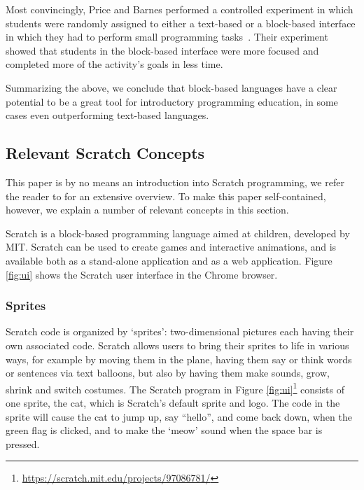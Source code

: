 \documentclass{sig-alternate}
\begin{document}
Most convincingly, Price and Barnes performed a controlled experiment in which students were randomly assigned to either a text-based or a block-based interface in  which they had to perform small programming tasks~\cite{price_comparing_2015}. Their experiment showed that students in the block-based interface were more focused and completed more of the activity's goals in less time.

Summarizing the above, we conclude that block-based languages have a clear potential to be a great tool for introductory programming education, in some cases even outperforming text-based languages.

\subsection{Relevant Scratch Concepts}
\label{sec:scratch}
This paper is by no means an introduction into Scratch programming, we refer the reader to \cite{brennan_creative_2014} for an extensive overview. To make this paper self-contained, however, we explain a number of relevant concepts in this section. 

Scratch is a block-based programming language aimed at children, developed by MIT. Scratch can be used to create games and interactive animations, and is available both as a stand-alone application and as a web application. Figure \ref{fig:ui} shows the Scratch user interface in the Chrome browser.

\subsubsection{Sprites}
Scratch code is organized by `sprites': two-dimensional pictures each having their own associated code. Scratch allows users to bring their sprites to life in various ways, for example by moving them in the plane, having them say or think words or sentences via text balloons, but also by having them make sounds, grow, shrink and switch costumes. The Scratch program in Figure \ref{fig:ui}\footnote{\url{https://scratch.mit.edu/projects/97086781/}} consists of one sprite, the cat, which is Scratch's default sprite and logo. The code in the sprite will cause the cat to jump up, say ``hello'', and come back down, when the green flag is clicked, and to make the `meow' sound when the space bar is pressed.
\end{document}
